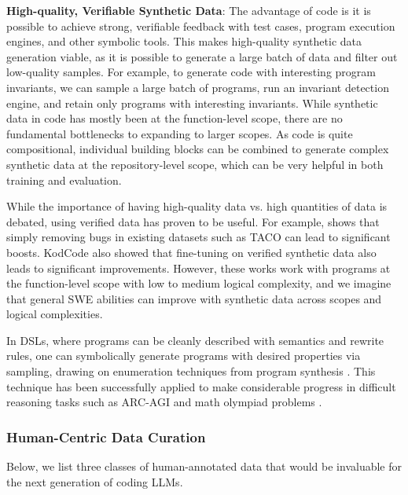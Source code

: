 \textbf{High-quality, Verifiable Synthetic Data}: The advantage of code is it is possible to achieve strong, verifiable feedback with test cases, program execution engines, and other symbolic tools. This makes high-quality synthetic data generation viable, as it is possible to generate a large batch of data and filter out low-quality samples. For example, to generate code with interesting program invariants, we can sample a large batch of programs, run an invariant detection engine, and retain only programs with interesting invariants. While synthetic data in code has mostly been at the function-level scope, there are no fundamental bottlenecks to expanding to larger scopes. As code is quite compositional, individual building blocks can be combined to generate complex synthetic data at the repository-level scope, which can be very helpful in both training and evaluation. 

While the importance of having high-quality data vs. high quantities of data is debated, using verified data has proven to be useful. For example, \citet{code-r1} shows that simply removing bugs in existing datasets such as TACO \citep{li2023taco} can lead to significant boosts. KodCode \citep{xu2024benchmark} also showed that fine-tuning on verified synthetic data also leads to significant improvements. However, these works work with programs at the function-level scope with low to medium logical complexity, and we imagine that general SWE abilities can improve with synthetic data across scopes and logical complexities.

In DSLs, where programs can be cleanly described with semantics and rewrite rules, one can symbolically generate programs with desired properties via sampling, drawing on enumeration techniques from program synthesis \citep{gulwani2017program}. This technique has been successfully applied to make considerable progress in difficult reasoning tasks such as ARC-AGI \citep{li2024combining} and math olympiad problems \citep{trinh2024solving, deepmindalphaproof, chervonyi2025gold}.

\subsubsection{Human-Centric Data Curation} \label{d:subsec-human-data}
\label{d:sec-human-supervision}

Below, we list three classes of human-annotated data that would be invaluable for the next generation of coding LLMs.


